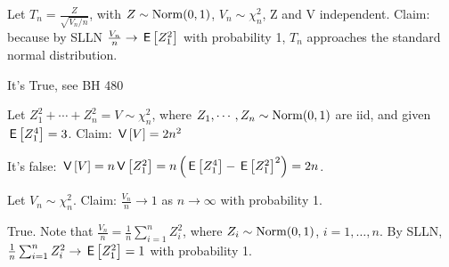 \documentclass[tf-tutorial-all.tex]{subfiles}
\begin{document}
\begin{truefalse}
Let $T_n = \frac{Z}{\sqrt{V_n/n}}$, with $Z\sim \mathrm{Norm}(0,1)$, $V_n\sim \chi_n^2$, Z and V independent.
Claim: because by SLLN $\frac{V_n}{n}\rightarrow \,\mathsf{E}\left[Z_1^2\right]$ with probability 1, $T_n$ approaches the standard normal distribution.
\begin{solution}
It's True, see BH 480
\end{solution}
\end{truefalse}

\begin{truefalse}
Let $Z_1^2 + \cdots + Z_n^2 = V \sim \chi^2_n$, where $Z_1, \cdots ,Z_n \sim \mathrm{Norm}(0,1)$ are iid,
and given $\,\mathsf{E}\left[Z_1^4\right] = 3$.
Claim: $\,\mathsf{V}\left[V\right] = 2n^2$
\begin{solution}
It's false: $\,\mathsf{V}\left[V\right] = n\,\mathsf{V}\left[Z_1^2\right] = n\left(\,\mathsf{E}\left[Z_1^4\right] - \,\mathsf{E}\left[Z_1^2\right]^2\right) = 2n$.
\end{solution}
\end{truefalse}

\begin{truefalse}
Let $V_n \sim \chi^2_n$. Claim: $\frac{V_n}{n}\to1$ as $n\to\infty$ with probability 1.

\begin{solution}
True. Note that $\frac{V_n}{n}=\frac{1}{n}\sum_{i=1}^nZ_i^2$, where $Z_i \sim \mathrm{Norm}(0,1)$, $i=1,\dots,n$. By SLLN, $\frac{1}{n}\sum_{i=1}^nZ_i^2\to\,\mathsf{E}\left[Z_1^2\right]=1$ with probability 1.
\end{solution}
\end{truefalse}
\end{document}
